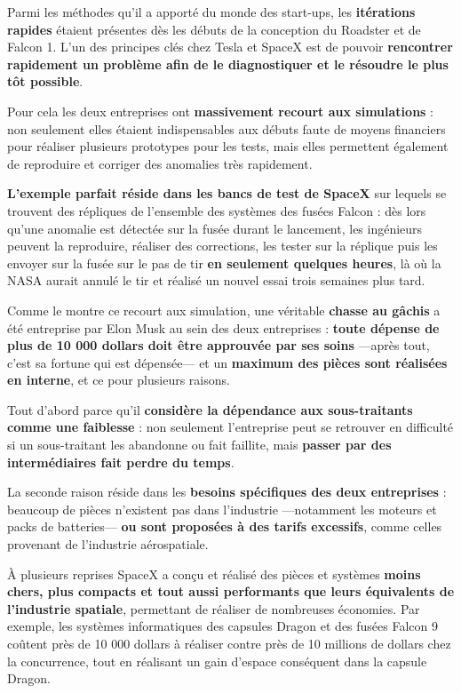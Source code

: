 \vspace{5mm}

Parmi les méthodes qu'il a apporté du monde des start-ups, les \textbf{itérations rapides} étaient présentes dès les débuts de la conception du Roadster et de Falcon 1. L'un des principes clés chez Tesla et SpaceX est de pouvoir \textbf{rencontrer rapidement un problème afin de le diagnostiquer et le résoudre le plus tôt possible}.

Pour cela les deux entreprises ont \textbf{massivement recourt aux simulations} : non seulement elles étaient indispensables aux débuts faute de moyens financiers pour réaliser plusieurs prototypes pour les tests, mais elles permettent également de reproduire et corriger des anomalies très rapidement.

\textbf{L'exemple parfait réside dans les bancs de test de SpaceX} sur lequels se trouvent des répliques de l'ensemble des systèmes des fusées Falcon : dès lors qu'une anomalie est détectée sur la fusée durant le lancement, les ingénieurs peuvent la reproduire, réaliser des corrections, les tester sur la réplique puis les envoyer sur la fusée sur le pas de tir \textbf{en seulement quelques heures}, là où la NASA aurait annulé le tir et réalisé un nouvel essai trois semaines plus tard.

\vspace{5mm}

Comme le montre ce recourt aux simulation, une véritable \textbf{chasse au gâchis} a été entreprise par Elon Musk au sein des deux entreprises : \textbf{toute dépense de plus de 10 000 dollars doit être approuvée par ses soins} ---après tout, c'est sa fortune qui est dépensée--- et un \textbf{maximum des pièces sont réalisées en interne}, et ce pour plusieurs raisons.

Tout d'abord parce qu'il \textbf{considère la dépendance aux sous-traitants comme une faiblesse} : non seulement l'entreprise peut se retrouver en difficulté si un sous-traitant les abandonne ou fait faillite, mais \textbf{passer par des intermédiaires fait perdre du temps}.

La seconde raison réside dans les \textbf{besoins spécifiques des deux entreprises} : beaucoup de pièces n'existent pas dans l'industrie ---notamment les moteurs et packs de batteries--- \textbf{ou sont proposées à des tarifs excessifs}, comme celles provenant de l'industrie aérospatiale.

À plusieurs reprises SpaceX a conçu et réalisé des pièces et systèmes \textbf{moins chers, plus compacts et tout aussi performants que leurs équivalents de l'industrie spatiale}, permettant de réaliser de nombreuses économies. Par exemple, les systèmes informatiques des capsules Dragon et des fusées Falcon 9 coûtent près de 10 000 dollars à réaliser contre près de 10 millions de dollars chez la concurrence, tout en réalisant un gain d'espace conséquent dans la capsule Dragon.

